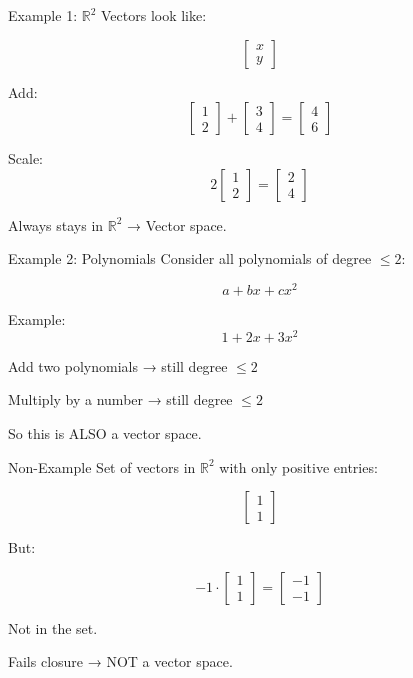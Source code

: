 \documentclass{beamer}
\begin{document}
\begin{frame}{Example 1: $\mathbb{R}^2$}
Vectors look like:

\[
\begin{bmatrix}x \\ y\end{bmatrix}
\]

Add:
\[
\begin{bmatrix}1 \\ 2\end{bmatrix}
+
\begin{bmatrix}3 \\ 4\end{bmatrix}
=
\begin{bmatrix}4 \\ 6\end{bmatrix}
\]

Scale:
\[
2 \begin{bmatrix}1 \\ 2\end{bmatrix}
=
\begin{bmatrix}2 \\ 4\end{bmatrix}
\]

Always stays in $\mathbb{R}^2$ → Vector space.
\end{frame}


\begin{frame}{Example 2: Polynomials}
Consider all polynomials of degree $\le 2$:

\[
a + bx + cx^2
\]

Example:
\[
1 + 2x + 3x^2
\]

Add two polynomials → still degree $\le 2$

Multiply by a number → still degree $\le 2$

So this is ALSO a vector space.
\end{frame}


\begin{frame}{Non-Example}
Set of vectors in $\mathbb{R}^2$ with only positive entries:

\[
\begin{bmatrix}1 \\ 1\end{bmatrix}
\]

But:

\[
-1 \cdot
\begin{bmatrix}1 \\ 1\end{bmatrix}
=
\begin{bmatrix}-1 \\ -1\end{bmatrix}
\]

Not in the set.

Fails closure → NOT a vector space.
\end{frame}
\end{document}
